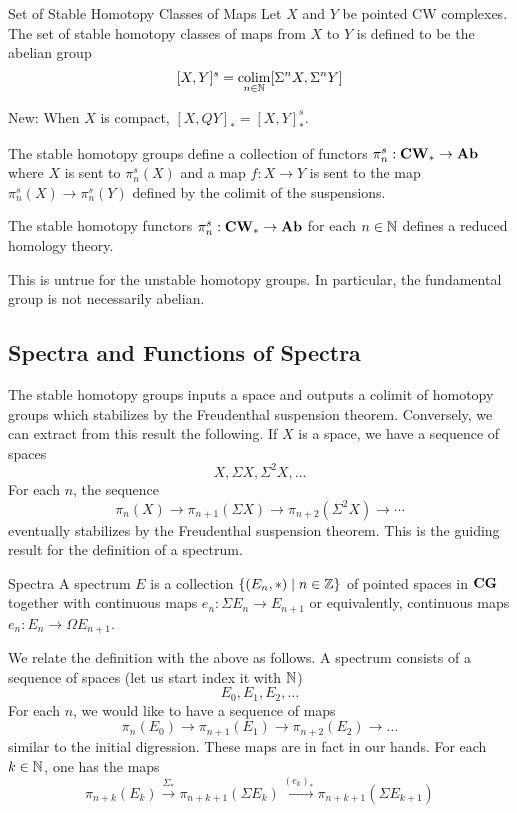 \documentclass[a4paper]{article}
\begin{document}
\begin{defn}{Set of Stable Homotopy Classes of Maps}{} Let $X$ and $Y$ be pointed CW complexes. The set of stable homotopy classes of maps from $X$ to $Y$ is defined to be the abelian group $$[X,Y]^s=\operatorname*{colim}_{n\in\mathbb{N}}[\Sigma^nX,\Sigma^nY]$$
\end{defn}

New: When $X$ is compact, $[X,QY]_\ast=[X,Y]_\ast^s$. 

\begin{thm}{}{} The stable homotopy groups define a collection of functors $\pi_n^s:\bold{CW}_\ast\to\bold{Ab}$ where $X$ is sent to $\pi_n^s(X)$ and a map $f:X\to Y$ is sent to the map $\pi_n^s(X)\to\pi_n^s(Y)$ defined by the colimit of the suspensions. 
\end{thm}

\begin{thm}{}{} The stable homotopy functors $\pi_n^s:\bold{CW}_\ast\to\bold{Ab}$ for each $n\in\mathbb{N}$ defines a reduced homology theory. 
\end{thm}

This is untrue for the unstable homotopy groups. In particular, the fundamental group is not necessarily abelian. 

\subsection{Spectra and Functions of Spectra}
The stable homotopy groups inputs a space and outputs a colimit of homotopy groups which stabilizes by the Freudenthal suspension theorem. Conversely, we can extract from this result the following. If $X$ is a space, we have a sequence of spaces $$X,\Sigma X,\Sigma^2X,\dots$$ For each $n$, the sequence $$\pi_n(X)\to\pi_{n+1}(\Sigma X)\to\pi_{n+2}(\Sigma^2X)\to\cdots$$ eventually stabilizes by the Freudenthal suspension theorem. This is the guiding result for the definition of a spectrum. 

\begin{defn}{Spectra}{} A spectrum $E$ is a collection $\{(E_n,\ast)\;|\;n\in\mathbb{Z}\}$ of pointed spaces in $\bold{CG}$ together with continuous maps $e_n:\Sigma E_n\to E_{n+1}$ or equivalently, continuous maps $e_n:E_n\to\Omega E_{n+1}$. 
\end{defn}

We relate the definition with the above as follows. A spectrum consists of a sequence of spaces (let us start index it with $\mathbb{N}$) $$E_0,E_1,E_2,\dots$$ For each $n$, we would like to have a sequence of maps $$\pi_n(E_0)\to\pi_{n+1}(E_1)\to\pi_{n+2}(E_2)\to\dots$$ similar to the initial digression. These maps are in fact in our hands. For each $k\in\mathbb{N}$, one has the maps $$\pi_{n+k}(E_k)\overset{\Sigma_\ast}{\to}\pi_{n+k+1}(\Sigma E_k)\overset{(e_k)_\ast}{\to}\pi_{n+k+1}(\Sigma E_{k+1})$$~\\
\end{document}
